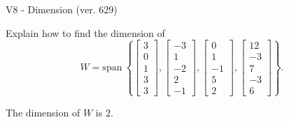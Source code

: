 \begin{exercise}
  \begin{exerciseTitle}V8 - Dimension (ver. 629)\end{exerciseTitle}
  \begin{exerciseStatement}
    Explain how to find the dimension of 
\[W=\mathrm{span}\ \left\{\left[\begin{array}{r}
3 \\
0 \\
1 \\
3 \\
3
\end{array}\right] , \left[\begin{array}{r}
-3 \\
1 \\
-2 \\
2 \\
-1
\end{array}\right] , \left[\begin{array}{r}
0 \\
1 \\
-1 \\
5 \\
2
\end{array}\right] , \left[\begin{array}{r}
12 \\
-3 \\
7 \\
-3 \\
6
\end{array}\right]\right\}.\]



  \end{exerciseStatement}
  \begin{exerciseAnswer}
   The dimension of \(W\) is  \(2\).
  


  \end{exerciseAnswer}
\end{exercise}
